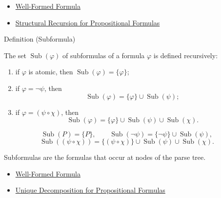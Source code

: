 \begin{dependencies}
\begin{itemize}
  \item \hyperref[def:well-formed-formula]{Well-Formed Formula}
  \item \hyperref[thm:structural-recursion-propositional-formulas]{Structural Recursion for Propositional Formulas}
\end{itemize}
\end{dependencies}
\begin{definitionbox}{Definition (Subformula)}
\begin{definition}[Subformula]
\label{def:subformula-propositional-logic}
The set \(\operatorname{Sub}(\varphi)\) of subformulas of a formula \(\varphi\) is defined recursively:
\begin{enumerate}
\item if \(\varphi\) is atomic, then \(\operatorname{Sub}(\varphi)=\{\varphi\}\);
\item if \(\varphi=\neg\psi\), then
\[
\operatorname{Sub}(\varphi)=\{\varphi\}\cup\operatorname{Sub}(\psi);
\]
\item if \(\varphi=(\psi\circ\chi)\), then
\[
\operatorname{Sub}(\varphi)=\{\varphi\}\cup\operatorname{Sub}(\psi)\cup\operatorname{Sub}(\chi).
\]
\end{enumerate}
\end{definition}
\end{definitionbox}

\begin{remark*}
\[
\operatorname{Sub}(P)=\{P\},\qquad
\operatorname{Sub}(\neg\psi)=\{\neg\psi\}\cup\operatorname{Sub}(\psi),
\]
\[
\operatorname{Sub}((\psi\circ\chi))
=
\{(\psi\circ\chi)\}\cup\operatorname{Sub}(\psi)\cup\operatorname{Sub}(\chi).
\]
\end{remark*}

\begin{remark*}[Interpretation]
Subformulas are the formulas that occur at nodes of the parse tree.
\end{remark*}

\begin{dependencies}
\begin{itemize}
  \item \hyperref[def:well-formed-formula]{Well-Formed Formula}
  \item \hyperref[thm:unique-decomposition-propositional-formulas]{Unique Decomposition for Propositional Formulas}
\end{itemize}
\end{dependencies}

